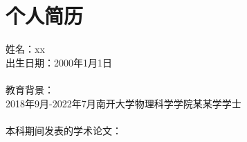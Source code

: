 
\chapter*{个人简历}

\noindent 姓名：xx\\
出生日期：2000年1月1日\\
\\
教育背景：\\
2018年9月-2022年7月\quad 南开大学\quad 物理科学学院\quad\quad\quad\quad 某某学\quad\quad 学士 \\
\\
本科期间发表的学术论文：\\

